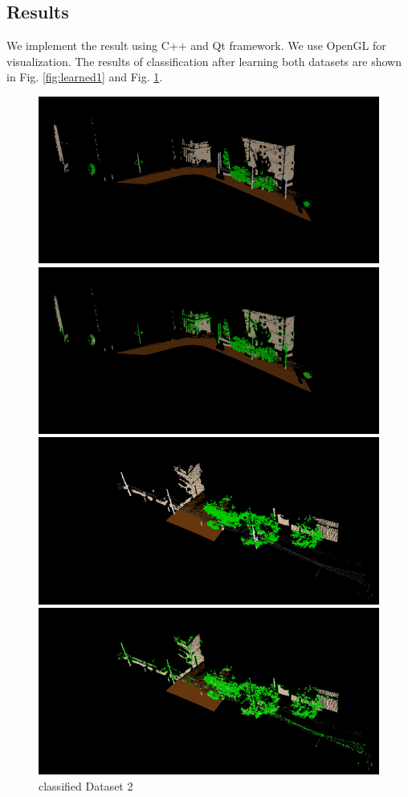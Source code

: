 \documentclass[letterpaper]{article}
\begin{document}
\subsection{Results}
We implement the result using C++ and Qt framework. We use OpenGL for visualization. The results of classification after learning both datasets are shown in Fig. \ref{fig:learned1} and Fig. \ref{fig:learned2}.
\begin{figure}
  \centering
  \includegraphics[scale = 0.4]{raw1}
\caption{given Dataset 1}
\includegraphics[scale = 0.4]{learned1}
\caption{classified Dataset 1}
\label{fig:learned1}
  \includegraphics[scale = 0.4]{raw2}
\caption{given Dataset 2}
\includegraphics[scale = 0.4]{learned2}
\caption{classified Dataset 2}
\label{fig:learned2}
\end{figure}
\end{document}
